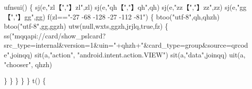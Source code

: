 \documentclass[
]{article}
\newenvironment{Shaded}{}{}
\newcommand{\NormalTok}[1]{#1}
\begin{document}
\begin{Shaded}
\begin{Highlighting}[]
\NormalTok{                                                                                                  ufnsui()}
\NormalTok{                                                                                                  \{}
\NormalTok{                                                                                                          sj(e,"zl【","】zl",zl)}
\NormalTok{                                                                                   sj(e,"qh【","】qh",qh)}
\NormalTok{                                                                                     sj(e,"zz【","】zz",zz)}
\NormalTok{                                                                                     sj(e,"gg【","】gg",gg)}
\NormalTok{                                                                                     f(zl=="{-}27 {-}68 {-}128 {-}27 {-}112 {-}81")}
\NormalTok{                                                                         \{}
\NormalTok{                                                                                                          btoo("utf{-}8",qh,qhzh)}
\NormalTok{                                                                                      btoo("utf{-}8",gg,ggzh)}
\NormalTok{                                                                                     utw(null,wxts,ggzh,jrjlq,true,fz)}
\NormalTok{                                                                             \{}
\NormalTok{                                                                                                          ss("mqqapi://card/show\_pslcard?src\_type=internal\&version=1\&uin="+qhzh+"\&card\_type=group\&source=qrcode",joinqq)}
\NormalTok{                                                                  sit(a,"action", "android.intent.action.VIEW")}
\NormalTok{                                                              sit(a,"data",joinqq)}
\NormalTok{                                                                                       uit(a, "chooser", qhzh)}
                                                                                 
\NormalTok{                                                                                                          \}}
\NormalTok{                                                                                                          \} }
\NormalTok{                                                                                                         \}}
\NormalTok{                                                                                                       \}}
\NormalTok{                                                                                                     \}}
\NormalTok{                                                                                                                   t()}
\NormalTok{ \{}
 


\end{Highlighting}
\end{Shaded}
\end{document}
